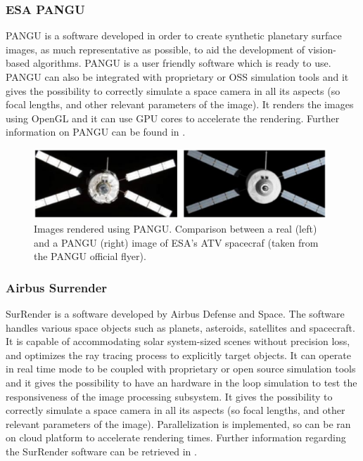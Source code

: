\subsubsection{ESA PANGU}
PANGU is a software developed in order to create synthetic planetary surface images, as much representative as possible, to aid the development of vision-based algorithms. PANGU is a user friendly software which is ready to use. PANGU can also be integrated with proprietary or OSS simulation tools and it gives the possibility to correctly simulate a space camera in all its aspects (so focal lengths, and other relevant parameters of the image). It renders the images using OpenGL and it can use GPU cores to accelerate the rendering. Further information on PANGU can be found in \cite{10.2514/6.2004-592-389}.

\begin{figure}[htbp]
  \centering
  \includegraphics[width=0.98\textwidth]{gfx/pangu.eps}
  \caption{Images rendered using PANGU. Comparison between a real (left) and a PANGU (right) image of ESA’s ATV spacecraf (taken from the PANGU official flyer).}
  \label{fig:PANGU}
\end{figure}

\subsubsection{Airbus Surrender}
SurRender is a software developed by Airbus Defense and Space. The software handles various space objects such as planets, asteroids, satellites and spacecraft. It is capable of accommodating solar system-sized scenes without precision loss, and optimizes the ray tracing process to explicitly target objects. It can operate in real time mode to be coupled with  proprietary or open source simulation tools and it gives the possibility to have an hardware in the loop simulation to test the responsiveness of the image processing subsystem. It gives the possibility to correctly simulate a space camera in all its aspects (so focal lengths, and other relevant parameters of the image). Parallelization is implemented, so can be ran on cloud platform to accelerate rendering times. Further information regarding the SurRender software can be retrieved in \cite{Brochard2018ScientificIR}.

